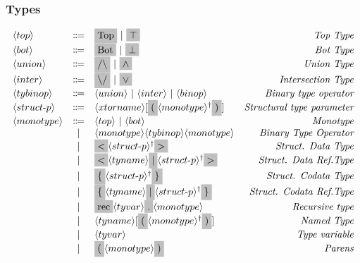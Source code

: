 \documentclass[11pt]{article}
\newcommand{\nonterminal}[1]{\langle #1 \rangle}
\newcommand{\terminal}[1]{\colorbox{lightgray}{\vphantom{X}#1}}
\newcommand{\commalist}[1]{#1^{\dagger}}
\begin{document}
\subsubsection{Types}
\[
  \begin{array}{lclr}
    \nonterminal{top} & \Coloneqq & \terminal{Top}\ |\ \terminal{$\top$} & \emph{Top Type} \\
    \nonterminal{bot} & \Coloneqq & \terminal{Bot}\ |\ \terminal{$\bot$} & \emph{Bot Type} \\
    \nonterminal{union} & \Coloneqq & \terminal{$/\backslash$}\ |\ \terminal{$\wedge$} & \emph{Union Type} \\
    \nonterminal{inter} & \Coloneqq & \terminal{$\backslash /$}\ |\ \terminal{$\vee$} & \emph{Intersection Type} \\
    \nonterminal{tybinop} & \Coloneqq & \nonterminal{union}\ |\ \nonterminal{inter}\ |\ \nonterminal{binop} & \emph{Binary type operator} \\
    \nonterminal{struct$-$p} & \Coloneqq & \nonterminal{xtorname}[\terminal{(}\commalist{\nonterminal{monotype}} \terminal{)}] & \emph{Structural type parameter} \\
    \nonterminal{monotype} & \Coloneqq & \nonterminal{top}\ |\ \nonterminal{bot} & \emph{Monotype} \\
    & | & \nonterminal{monotype} \nonterminal{tybinop} \nonterminal{monotype} & \emph{Binary Type Operator} \\
    & | & \terminal{$<$} \commalist{\nonterminal{struct$-$p}} \terminal{$>$} & \emph{Struct. Data Type} \\
    & | & \terminal{$<$} \nonterminal{tyname} \terminal{$|$} \commalist{\nonterminal{struct$-$p}} \terminal{$>$} & \emph{Struct. Data Ref.Type} \\
    & | & \terminal{$\{$} \commalist{\nonterminal{struct$-$p}} \terminal{$\}$} & \emph{Struct. Codata Type} \\
    & | & \terminal{$\{$} \nonterminal{tyname} \terminal{$|$} \commalist{\nonterminal{struct$-$p}} \terminal{$\}$} & \emph{Struct. Codata Ref.Type} \\
    & | & \terminal{rec} \nonterminal{tyvar} \terminal{.} \nonterminal{monotype} & \emph{Recursive type} \\
    & | & \nonterminal{tyname}[\terminal{(} \commalist{\nonterminal{monotype}}\terminal{)}] & \emph{Named Type} \\
    & | & \nonterminal{tyvar} & \emph{Type variable} \\
    & | & \terminal{(} \nonterminal{monotype} \terminal{)} & \emph{Parens} \\[4mm]

\end{array}\]
\end{document}
